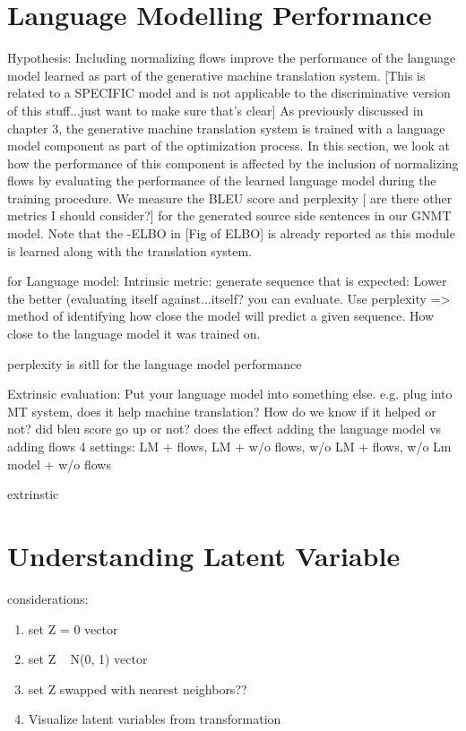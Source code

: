 \section{Language Modelling Performance}

Hypothesis: Including normalizing flows improve the performance of the language model learned as part of the generative machine translation system. [This is related to a SPECIFIC model and is not applicable to the discriminative version of this stuff...just want to make sure that's clear]
As previously discussed in chapter 3, the generative machine translation system is trained with a language model component as part of the optimization process. In this section, we look at how the performance of this component is affected by the inclusion of normalizing flows by evaluating the performance of the learned language model during the training procedure. We measure the BLEU score and perplexity  [ are there other metrics I should consider?] for the generated source side sentences in our GNMT model. Note that the -ELBO in [Fig of ELBO] is already reported as this module is learned along with the translation system.

for Language model:
Intrinsic metric: generate sequence that is expected: Lower the better (evaluating itself against...itself? you can evaluate. Use perplexity => method of identifying how close the model will predict a given sequence. How close to the language model it was trained on. 

perplexity is sitll for the language model performance

Extrinsic evaluation: Put your language model into something else. e.g. plug into MT system, does it help machine translation?
How do we know if it helped or not? did bleu score go up or not? 
does the effect adding the language model vs adding flows
4 settings: LM + flows, LM + w/o flows, w/o LM + flows, w/o Lm model + w/o flows


extrinstic







\section{Understanding Latent Variable}

considerations:
\begin{enumerate}
	\item set Z = 0 vector
	\item set Z ~ N(0, 1) vector
	\item set Z swapped with nearest neighbors??
	\item Visualize latent variables from transformation
\end{enumerate}